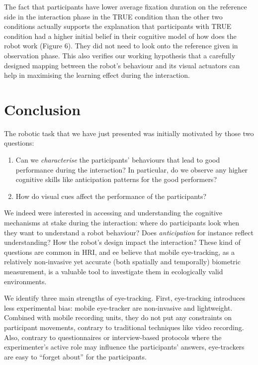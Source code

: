 \documentclass{sig-alternate}
\begin{document}
The fact that participants have lower average fixation duration on the
reference side in the interaction phase in the {\sf TRUE} condition than the
other two conditions actually supports the explanation that participants
with {\sf TRUE} condition had a higher initial belief in their cognitive model
of how does the robot work (Figure 6). They did not need to look onto
the reference given in observation phase. This also verifies our working
hypothesis that a carefully designed mapping between the robot's
behaviour and its visual actuators can help in maximising the learning
effect during the interaction. 


\section{Conclusion}
\label{conclusion}

The robotic task that we have just presented was initially motivated by those
two questions:

\begin{enumerate}
    \item Can we \emph{characterise} the participants' behaviours that
        lead to good performance during the interaction? In particular, do
        we observe any higher cognitive skills like anticipation patterns for
        the good performers?

    \item How do visual cues affect the performance of the participants?

\end{enumerate}

We indeed were interested in accessing and understanding the cognitive
mechanisms at stake during the interaction: where do participants look when they
want to understand a robot behaviour? Does \emph{anticipation} for instance
reflect understanding? How the robot's design impact the interaction? These kind
of questions are common in HRI, and ee believe that mobile eye-tracking, as a
relatively non-invasive yet accurate (both spatially and temporally) biometric
measurement, is a valuable tool to investigate them in ecologically
valid environments.

We identify three main strengths of eye-tracking. First, eye-tracking introduces
less experimental bias: mobile eye-tracker are non-invasive and lightweight.
Combined with mobile recording units, they do not put any constraints on
participant movements, contrary to traditional techniques like video recording.
Also, contrary to questionnaires or interview-based protocols where the
experimenter's active role may influence the participants' answers, eye-trackers
are easy to ``forget about'' for the participants.
\end{document}
